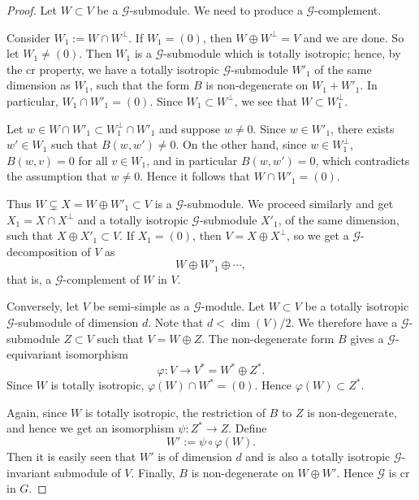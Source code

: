 \documentclass[11pt]{article}
\begin{document}
\begin{proof}
Let \(W\subset V\) be a \(\mathcal G\)-submodule. We need to produce a
\(\mathcal G\)-complement.

Consider \(W_1:=W\cap W^\perp\). If \(W_1=(0)\), then
\(W\oplus W^\perp=V\) and we are done. So let \(W_1\ne(0)\). Then \(W_1\) is a
\(\mathcal G\)-submodule which is totally isotropic; hence, by the \(\mathrm{cr}\)
property, we have a totally isotropic \(\mathcal G\)-submodule \(W'_1\) of the same
dimension as \(W_1\), such that the form \(B\) is non-degenerate on
\(W_1+W'_1\). In particular, \(W_1\cap W'_1=(0)\). Since \(W_1\subset W^\perp\),
we see that \(W\subset W_1^\perp\).

Let \(w\in W\cap W'_1\subset W_1^\perp\cap W'_1\) and suppose \(w\ne0\). Since
\(w\in W'_1\), there exists \(w'\in W_1\) such that \(B(w,w')\ne0\). On the other
hand, since \(w\in W_1^\perp\), \(B(w,v)=0\) for all \(v\in W_1\), and in particular
\(B(w,w')=0\), which contradicts the assumption that \(w\ne0\). Hence it follows that
\(W\cap W'_1=(0)\).

Thus \(W\subsetneq X=W\oplus W'_1\subset V\) is a \(\mathcal G\)-submodule. We
proceed similarly and get \(X_1=X\cap X^\perp\) and a totally isotropic
\(\mathcal G\)-submodule \(X'_1\), of the same dimension, such that
\(X\oplus X'_1\subset V\). If \(X_1=(0)\), then \(V=X\oplus X^\perp\), so we get a
\(\mathcal G\)-decomposition of \(V\) as
\[
  W\oplus W'_1\oplus\cdots,
\]
that is, a \(\mathcal G\)-complement of \(W\) in \(V\).

Conversely, let \(V\) be semi-simple as a \(\mathcal G\)-module. Let \(W\subset V\)
be a totally isotropic \(\mathcal G\)-submodule of dimension \(d\). Note that
\(d<\dim(V)/2\). We therefore have a \(\mathcal G\)-submodule \(Z\subset V\) such
that \(V=W\oplus Z\). The non-degenerate form \(B\) gives a \(\mathcal G\)-equivariant
isomorphism
\[
  \varphi:V\longrightarrow V^*=W^*\oplus Z^*.
\]
Since \(W\) is totally isotropic, \(\varphi(W)\cap W^*=(0)\). Hence
\(\varphi(W)\subset Z^*\).

Again, since \(W\) is totally isotropic, the restriction of \(B\) to \(Z\) is
non-degenerate, and hence we get an isomorphism \(\psi:Z^*\to Z\). Define
\[
  W':=\psi\circ\varphi(W).
\]
Then it is easily seen that \(W'\) is of dimension \(d\) and is also a totally isotropic
\(\mathcal G\)-invariant submodule of \(V\). Finally, \(B\) is non-degenerate on
\(W\oplus W'\). Hence \(\mathcal G\) is \(\mathrm{cr}\) in \(G\).
\end{proof}
\end{document}
